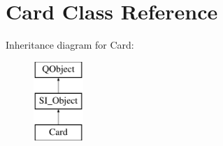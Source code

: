 \hypertarget{class_card}{}\section{Card Class Reference}
\label{class_card}
Inheritance diagram for Card\+:\begin{figure}[H]
\begin{center}
\leavevmode
\includegraphics[height=3.000000cm]{class_card}
\end{center}
\end{figure}
